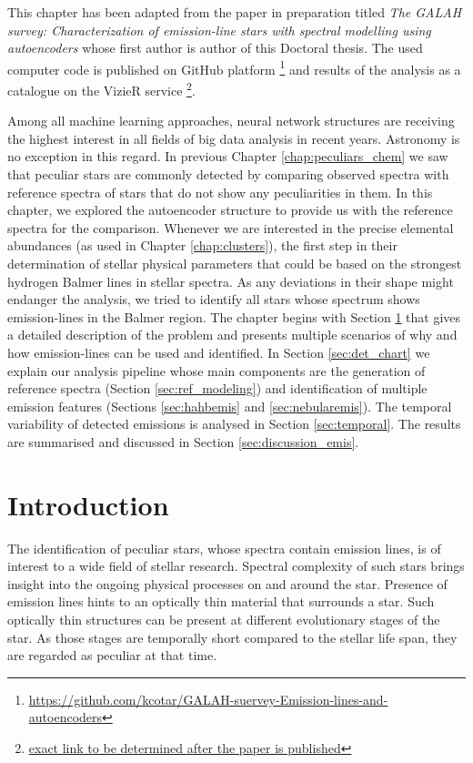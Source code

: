 This chapter has been adapted from the paper in preparation titled \textit{The GALAH survey: Characterization of emission-line stars with spectral modelling using autoencoders} \cite{2020arXiv200603062C} whose first author is author of this Doctoral thesis. The used computer code is published on GitHub platform \footnote{\url{https://github.com/kcotar/GALAH-suervey-Emission-lines-and-autoencoders}} and results of the analysis as a catalogue on the VizieR service \footnote{\href{http://vizier.u-strasbg.fr/viz-bin/}{exact link to be determined after the paper is published}}.

Among all machine learning approaches, neural network structures are receiving the highest interest in all fields of big data analysis in recent years. Astronomy is no exception in this regard. In previous Chapter \ref{chap:peculiars_chem} we saw that peculiar stars are commonly detected by comparing observed spectra with reference spectra of stars that do not show any peculiarities in them. In this chapter, we explored the autoencoder structure to provide us with the reference spectra for the comparison. Whenever we are interested in the precise elemental abundances (as used in Chapter \ref{chap:clusters}), the first step in their determination of stellar physical parameters that could be based on the strongest hydrogen Balmer lines in stellar spectra. As any deviations in their shape might endanger the analysis, we tried to identify all stars whose spectrum shows emission-lines in the Balmer region. The chapter begins with Section \ref{sec:intro_emis} that gives a detailed description of the problem and presents multiple scenarios of why and how emission-lines can be used and identified. In Section \ref{sec:det_chart} we explain our analysis pipeline whose main components are the generation of reference spectra (Section \ref{sec:ref_modeling}) and identification of multiple emission features (Sections \ref{sec:hahbemis} and \ref{sec:nebularemis}). The temporal variability of detected emissions is analysed in Section \ref{sec:temporal}. The results are summarised and discussed in Section \ref{sec:discussion_emis}.

\section{Introduction}
\label{sec:intro_emis}
The identification of peculiar stars, whose spectra contain emission lines, is of interest to a wide field of stellar research. Spectral complexity of such stars brings insight into the ongoing physical processes on and around the star. Presence of emission lines hints to an optically thin material that surrounds a star. Such optically thin structures can be present at different evolutionary stages of the star. As those stages are temporally short compared to the stellar life span, they are regarded as peculiar at that time.


